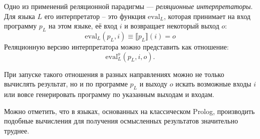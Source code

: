 
Одно из применений реляционной парадигмы --- {\it реляционные интерпретаторы}.
Для языка $L$ его интерпретатор -- это функция $\text{eval}_L$, которая принимает
на вход программу $p_L$ на этом языке, её вход $i$ и возвращает некоторый выход $o$:
\[ \text{eval}_L (p_L, i) \equiv \llbracket p_L \rrbracket (i) = o \]
Реляционную версию интерпретатора можно представить как отношение:
\[ \text{eval}_L^o(p_L, i, o). \]

При запуске такого отношения в разных направлениях можно не только вычислять результат,
но и по программе $p_L$ и выходу $o$
искать возможные входы $i$ или вовсе генерировать программу по указанным
выходам и входам.

Можно отметить, что в языках, основанных на классическом Prolog, производить
подобные вычисления для получения осмысленных результатов значительно труднее.
